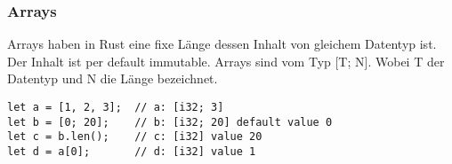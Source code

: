 \subsubsection{Arrays}
Arrays haben in Rust eine fixe Länge dessen Inhalt von gleichem Datentyp ist.
Der Inhalt ist per default immutable. Arrays sind vom Typ [T; N]. Wobei T der Datentyp und N die Länge bezeichnet.
\begin{lstlisting}
let a = [1, 2, 3]; 	// a: [i32; 3]
let b = [0; 20]; 	// b: [i32; 20] default value 0
let c = b.len(); 	// c: [i32] value 20
let d = a[0]; 		// d: [i32] value 1
\end{lstlisting}